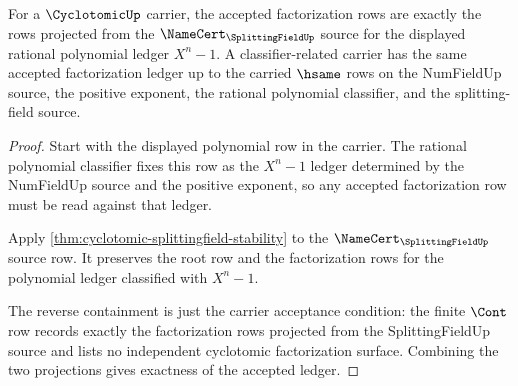 \begin{theorem}
\label{thm:cyclotomic-factorization-ledger-exactness}
For a $\CyclotomicUp$ carrier, the accepted factorization rows are exactly the rows projected from the $\NameCert_{\SplittingFieldUp}$ source for the displayed rational polynomial ledger $X^n-1$. A classifier-related carrier has the same accepted factorization ledger up to the carried $\hsame$ rows on the NumFieldUp source, the positive exponent, the rational polynomial classifier, and the splitting-field source.
\end{theorem}
\begin{proof}
Start with the displayed polynomial row in the carrier. The rational polynomial classifier fixes this row as the $X^n-1$ ledger determined by the NumFieldUp source and the positive exponent, so any accepted factorization row must be read against that ledger.

Apply \autoref{thm:cyclotomic-splittingfield-stability} to the $\NameCert_{\SplittingFieldUp}$ source row. It preserves the root row and the factorization rows for the polynomial ledger classified with $X^n-1$.

The reverse containment is just the carrier acceptance condition: the finite $\Cont$ row records exactly the factorization rows projected from the SplittingFieldUp source and lists no independent cyclotomic factorization surface. Combining the two projections gives exactness of the accepted ledger.
\end{proof}

